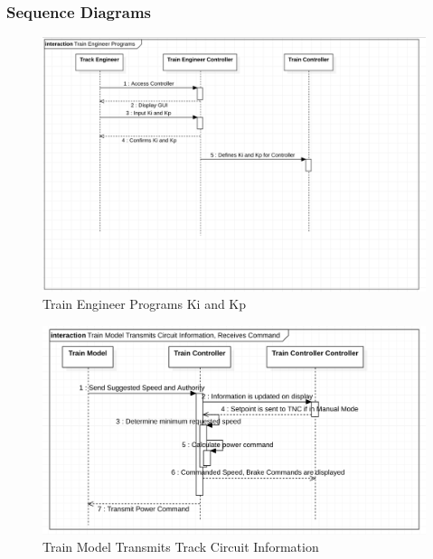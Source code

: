 \documentclass{article}
\begin{document}
    \subsubsection{Sequence Diagrams}
    \begin{figure}[H]
        \centering
        \includegraphics[width=\textwidth]{./TNCSD/TrainEngineerPrograms.png}
        \caption{Train Engineer Programs Ki and Kp}
        \label{fig:Train Engineer Programs Ki and Kp}
    \end{figure}
    
    \begin{figure}[H]
        \centering
        \includegraphics[width=\textwidth]{./TNCSD/TrackCircuitTransmit.png}
        \caption{Train Model Transmits Track Circuit Information}
        \label{fig:Train Model Transmits Track Circuit Information}
    \end{figure}
    
\end{document}

